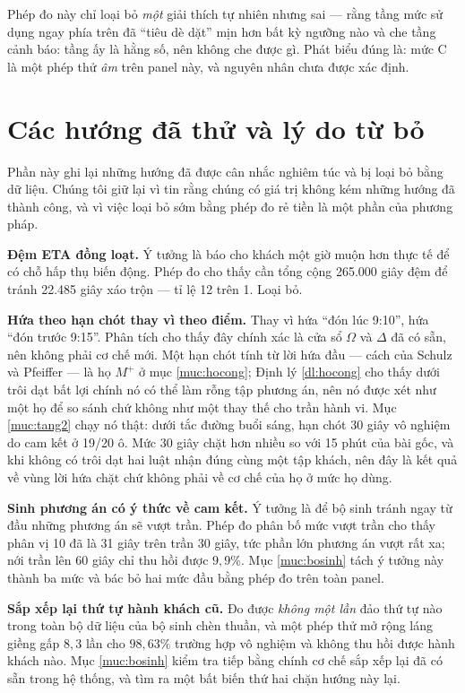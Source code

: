Phép đo này chỉ loại bỏ \emph{một} giải thích tự nhiên nhưng sai --- rằng tầng mức sử dụng ngay
phía trên đã ``tiêu dè dặt'' mịn hơn bất kỳ ngưỡng nào và che tầng cảnh báo: tầng ấy là hằng số, nên
không che được gì. Phát biểu đúng là: mức C là một phép thử \emph{âm} trên panel này, và nguyên nhân
chưa được xác định.

\section{Các hướng đã thử và lý do từ bỏ}
\label{muc:dathu}

Phần này ghi lại những hướng đã được cân nhắc nghiêm túc và bị loại bỏ bằng dữ liệu. Chúng tôi
giữ lại vì tin rằng chúng có giá trị không kém những hướng đã thành công, và vì việc loại bỏ
sớm bằng phép đo rẻ tiền là một phần của phương pháp.

\textbf{Đệm ETA đồng loạt.} Ý tưởng là báo cho khách một giờ muộn hơn thực tế để có chỗ hấp thụ
biến động. Phép đo cho thấy cần tổng cộng 265.000 giây đệm để tránh 22.485 giây xáo trộn --- tỉ
lệ 12 trên 1. Loại bỏ.

\textbf{Hứa theo hạn chót thay vì theo điểm.} Thay vì hứa ``đón lúc 9:10'', hứa ``đón trước
9:15''. Phân tích cho thấy đây chính xác là cửa sổ $\Omega$ và $\Delta$ đã có sẵn, nên không
phải cơ chế mới. Một hạn chót tính từ lời hứa đầu --- cách của Schulz và Pfeiffer
\cite{schulz2026} --- là họ $M^{+}$ ở mục \ref{muc:hocong}; Định lý \ref{dl:hocong} cho thấy
dưới trôi dạt bất lợi chính nó có thể làm rỗng tập phương án, nên nó được xét như một họ để so
sánh chứ không như một thay thế cho trần hành vi. Mục \ref{muc:tang2} chạy nó thật: dưới tắc đường
buổi sáng, hạn chót 30 giây vô nghiệm do cam kết ở 19/20 ô. Mức 30 giây chặt hơn nhiều so với 15 phút
của bài gốc, và khi không có trôi dạt hai luật nhận đúng cùng một tập khách, nên đây là kết quả về
vùng lời hứa chặt chứ không phải về cơ chế của họ ở mức họ dùng.

\textbf{Sinh phương án có ý thức về cam kết.} Ý tưởng là để bộ sinh tránh ngay từ đầu những
phương án sẽ vượt trần. Phép đo phân bố mức vượt trần cho thấy phân vị 10 đã là 31 giây trên
trần 30 giây, tức phần lớn phương án vượt rất xa; nới trần lên 60 giây chỉ thu hồi được
$9{,}9\%$. Mục \ref{muc:bosinh} tách ý tưởng này thành ba mức và bác bỏ hai mức đầu bằng phép
đo trên toàn panel.

\textbf{Sắp xếp lại thứ tự hành khách cũ.} Đo được \emph{không một lần} đảo thứ tự nào trong
toàn bộ dữ liệu của bộ sinh chèn thuần, và một phép thử mở rộng láng giềng gấp $8{,}3$ lần cho
$98{,}63\%$ trường hợp vô nghiệm và không thu hồi được hành khách nào. Mục \ref{muc:bosinh}
kiểm tra tiếp bằng chính cơ chế sắp xếp lại đã có sẵn trong hệ thống, và tìm ra một bất biến
thứ hai chặn hướng này lại.

